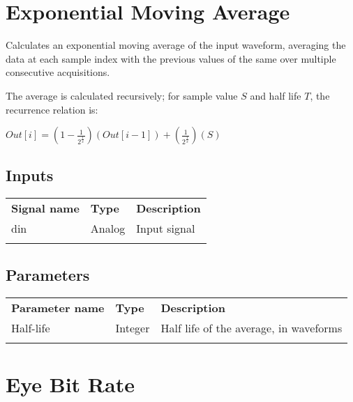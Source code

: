 \pagebreak
\section{Exponential Moving Average}
\label{filter:ema}

Calculates an exponential moving average of the input waveform, averaging the data at each sample index with the
previous values of the same over multiple consecutive acquisitions.

The average is calculated recursively; for sample value $S$ and half life $T$, the recurrence relation is:

\begin{math}
Out[i] =
	\left(1-\frac{1}{\displaystyle{2^\frac{1}{x}}}\right)\left(Out[i-1]\right) +
	\left(\frac{1}{\displaystyle{2^\frac{1}{x}}}\right)\left(S\right)
\end{math}

\subsection{Inputs}

\begin{tabularx}{16cm}{llX}
\thickhline
\textbf{Signal name} & \textbf{Type} & \textbf{Description} \\
\thickhline
din & Analog & Input signal\\
\thickhline
\end{tabularx}

\subsection{Parameters}

\begin{tabularx}{16cm}{llX}
\thickhline
\textbf{Parameter name} & \textbf{Type} & \textbf{Description} \\
\thickhline
Half-life & Integer & Half life of the average, in waveforms\\
\thickhline
\end{tabularx}

\pagebreak
\section{Eye Bit Rate}


